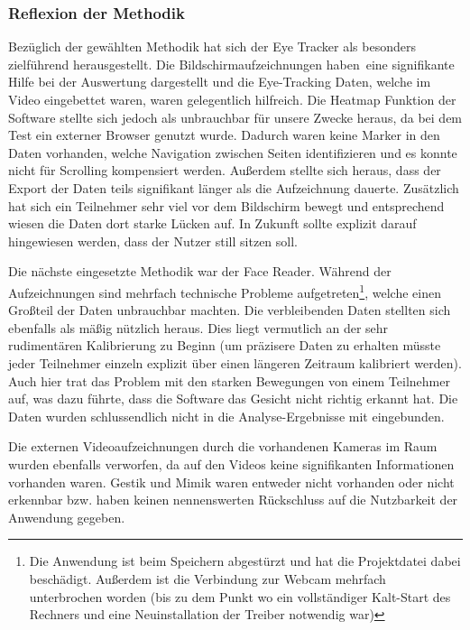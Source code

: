 \documentclass[
  12pt,
  ngerman,
  a4paper,
]{article}
\begin{document}
\hypertarget{reflexion-der-methodik-1}{%
\subsubsection{Reflexion der Methodik}\label{reflexion-der-methodik-1}}

Bezüglich der gewählten Methodik hat sich der Eye Tracker als besonders
zielführend herausgestellt. Die Bildschirmaufzeichnungen haben~eine
signifikante Hilfe bei der Auswertung dargestellt und die Eye-Tracking
Daten, welche im Video eingebettet waren, waren gelegentlich hilfreich.
Die Heatmap Funktion der Software stellte sich jedoch als unbrauchbar
für unsere Zwecke heraus, da bei dem Test ein externer Browser genutzt
wurde. Dadurch waren keine Marker in den Daten vorhanden, welche
Navigation zwischen Seiten identifizieren und es konnte nicht für
Scrolling kompensiert werden. Außerdem stellte sich heraus, dass der
Export der Daten teils signifikant länger als die Aufzeichnung dauerte.
Zusätzlich hat sich ein Teilnehmer sehr viel vor dem Bildschirm bewegt
und entsprechend wiesen die Daten dort starke Lücken auf. In Zukunft
sollte explizit darauf hingewiesen werden, dass der Nutzer still sitzen
soll.

Die nächste eingesetzte Methodik war der Face Reader. Während der
Aufzeichnungen sind mehrfach technische Probleme aufgetreten\footnote{Die
  Anwendung ist beim Speichern abgestürzt und hat die Projektdatei dabei
  beschädigt. Außerdem ist die Verbindung zur Webcam mehrfach
  unterbrochen worden (bis zu dem Punkt wo ein vollständiger Kalt-Start
  des Rechners und eine Neuinstallation der Treiber notwendig war)},
welche einen Großteil der Daten unbrauchbar machten. Die verbleibenden
Daten stellten sich ebenfalls als mäßig nützlich heraus. Dies liegt
vermutlich an der sehr rudimentären Kalibrierung zu Beginn (um präzisere
Daten zu erhalten müsste jeder Teilnehmer einzeln explizit über einen
längeren Zeitraum kalibriert werden). Auch hier trat das Problem mit den
starken Bewegungen von einem Teilnehmer auf, was dazu führte, dass die
Software das Gesicht nicht richtig erkannt hat. Die Daten wurden
schlussendlich nicht in die Analyse-Ergebnisse mit eingebunden.

Die externen Videoaufzeichnungen durch die vorhandenen Kameras im Raum
wurden ebenfalls verworfen, da auf den Videos keine signifikanten
Informationen vorhanden waren. Gestik und Mimik waren entweder nicht
vorhanden oder nicht erkennbar bzw. haben keinen nennenswerten
Rückschluss auf die Nutzbarkeit der Anwendung gegeben.
\end{document}
